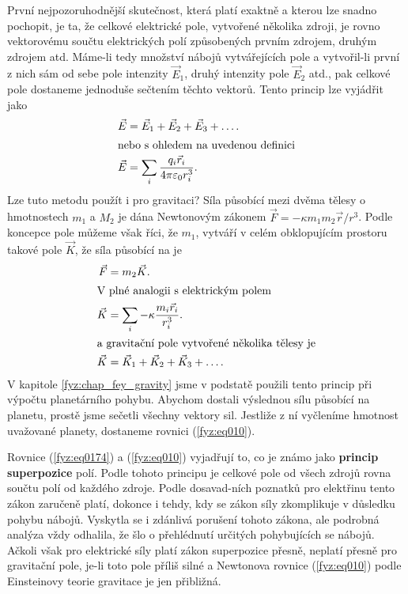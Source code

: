     První nejpozoruhodnější skutečnost, která platí exaktně a kterou lze snadno pochopit, je ta, že 
    celkové elektrické pole, vytvořené několika zdroji, je rovno vektorovému součtu elektrických 
    polí způsobených prvním zdrojem, druhým zdrojem atd. Máme-li tedy množství nábojů vytvářejících 
    pole a vytvořil-li první z nich sám od sebe pole intenzity \(\vec{E}_1\), druhý intenzity pole 
    \(\vec{E}_2\) atd., pak celkové pole dostaneme jednoduše sečtením těchto vektorů. Tento princip 
    lze vyjádřit jako
    \begin{align}
      \vec{E} &= \vec{E}_1 + \vec{E}_2 + \vec{E}_3 + \ldots.                  \label{fyz:eq0174} \\
      \shortintertext{nebo s ohledem na uvedenou definici}
      \vec{E} &= \sum_i\frac{q_i\vec{r}_i}{4\pi\varepsilon_0r_i^3}.           \label{fyz:eq0175}
    \end{align}
    Lze tuto metodu použít i pro gravitaci? Síla působící mezi dvěma tělesy o hmotnostech \(m_1\) a 
    \(M_2\) je dána Newtonovým zákonem \(\vec{F} = -\kappa m_1m_2\vec{r}/r^3\). Podle koncepce pole 
    můžeme však říci, že \(m_1\), vytváří v celém obklopujícím prostoru takové pole \(\vec{K}\), že 
    síla působící na je
    \begin{align}
      \vec{F} &= m_2\vec{K}.                                                \label{fyz:eq0176}  \\
      \shortintertext{V plné analogii s elektrickým polem}
      \vec{K} &= \sum_i-\kappa\frac{m_i\vec{r}_i}{r_i^3}.                   \label{fyz:eq0177}  \\
      \shortintertext{a gravitační pole vytvořené několika tělesy je}
      \vec{K} &= \vec{K}_1 + \vec{K}_2 + \vec{K}_3 + \ldots.                \label{fyz:eq010}
    \end{align}
    V kapitole \ref{fyz:chap_fey_gravity} jsme v podstatě použili tento princip při výpočtu 
    planetárního pohybu. Abychom dostali výslednou sílu působící na planetu, prostě jsme sečetli 
    všechny vektory sil. Jestliže z ní vyčleníme hmotnost uvažované planety, dostaneme rovnici 
    (\ref{fyz:eq010}).
    
    Rovnice (\ref{fyz:eq0174}) a (\ref{fyz:eq010}) vyjadřují to, co je známo jako \textbf{princip 
    superpozice} polí. Podle tohoto principu je celkové pole od všech zdrojů rovna součtu polí od 
    každého zdroje. Podle dosavad-ních poznatků pro elektřinu tento zákon zaručeně platí, dokonce i 
    tehdy, kdy se zákon síly zkomplikuje v důsledku pohybu nábojů. Vyskytla se i zdánlivá porušení 
    tohoto zákona, ale podrobná analýza vždy odhalila, že šlo o přehlédnutí určitých pohybujících 
    se nábojů. Ačkoli však pro elektrické síly platí zákon superpozice přesně, neplatí přesně pro 
    gravitační pole, je-li toto pole příliš silné a Newtonova rovnice (\ref{fyz:eq010}) podle 
    Einsteinovy teorie gravitace je jen přibližná.
    
